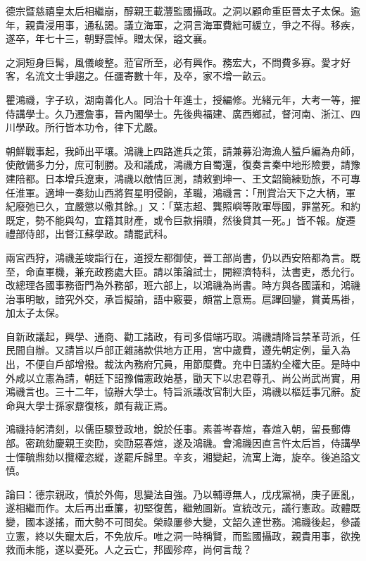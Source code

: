 \begin{pinyinscope}
德宗暨慈禧皇太后相繼崩，醇親王載灃監國攝政。之洞以顧命重臣晉太子太保。逾年，親貴浸用事，通私謁。議立海軍，之洞言海軍費絀可緩立，爭之不得。移疾，遂卒，年七十三，朝野震悼。贈太保，謚文襄。

之洞短身巨髯，風儀峻整。蒞官所至，必有興作。務宏大，不問費多寡。愛才好客，名流文士爭趨之。任疆寄數十年，及卒，家不增一畝云。

瞿鴻禨，字子玖，湖南善化人。同治十年進士，授編修。光緒元年，大考一等，擢侍講學士。久乃遷詹事，晉內閣學士。先後典福建、廣西鄉試，督河南、浙江、四川學政。所行皆本功令，律下尤嚴。

朝鮮戰事起，我師出平壤。鴻禨上四路進兵之策，請兼募沿海漁人蜑戶編為舟師，使敵備多力分，庶可制勝。及和議成，鴻禨方自蜀還，復奏言秦中地形險要，請豫建陪都。日本增兵遼東，鴻禨以敵情叵測，請敕劉坤一、王文韶簡練勁旅，不可專任淮軍。適坤一奏劾山西將賀星明侵餉，革職，鴻禨言：「刑賞治天下之大柄，軍紀廢弛已久，宜嚴懲以儆其餘。」又：「葉志超、龔照嶼等敗軍辱國，罪當死。和約既定，勢不能與勾，宜籍其財產，或令巨款捐贖，然後貸其一死。」皆不報。旋遷禮部侍郎，出督江蘇學政。請罷武科。

兩宮西狩，鴻禨差竣詣行在，道授左都御使，晉工部尚書，仍以西安陪都為言。既至，命直軍機，兼充政務處大臣。請以策論試士，開經濟特科，汰書吏，悉允行。改總理各國事務衙門為外務部，班六部上，以鴻禨為尚書。時方與各國議和，鴻禨治事明敏，諳究外交，承旨擬諭，語中竅要，頗當上意焉。扈蹕回鑾，賞黃馬褂，加太子太保。

自新政議起，興學、通商、勸工諸政，有司多借端巧取。鴻禨請降旨禁革苛派，任民間自辦。又請旨以戶部正雜諸款供地方正用，宮中歲費，遵先朝定例，量入為出，不便自戶部增撥。裁汰內務府冗員，用節糜費。充中日議約全權大臣。是時中外咸以立憲為請，朝廷下詔豫備憲政始基，勖天下以忠君尊孔、尚公尚武尚實，用鴻禨言也。三十二年，協辦大學士。特旨派議改官制大臣，鴻禨以樞廷事冗辭。旋命與大學士孫家鼐復核，頗有裁正焉。

鴻禨持躬清刻，以儒臣驟登政地，銳於任事。素善岑春煊，春煊入朝，留長郵傳部。密疏劾慶親王奕劻，奕劻惡春煊，遂及鴻禨。會鴻禨因直言忤太后旨，侍講學士惲毓鼎劾以攬權恣縱，遂罷斥歸里。辛亥，湘變起，流寓上海，旋卒。後追謚文慎。

論曰：德宗親政，憤於外侮，思變法自強。乃以輔導無人，戊戌黨禍，庚子匪亂，遂相繼而作。太后再出垂簾，初堅復舊，繼勉圖新。宣統改元，議行憲政。政體既變，國本遂搖，而大勢不可問矣。榮祿屢參大變，文韶久達世務。鴻禨後起，參議立憲，終以失寵太后，不免放斥。唯之洞一時稱賢，而監國攝政，親貴用事，欲挽救而未能，遂以憂死。人之云亡，邦國殄瘁，尚何言哉？


\end{pinyinscope}